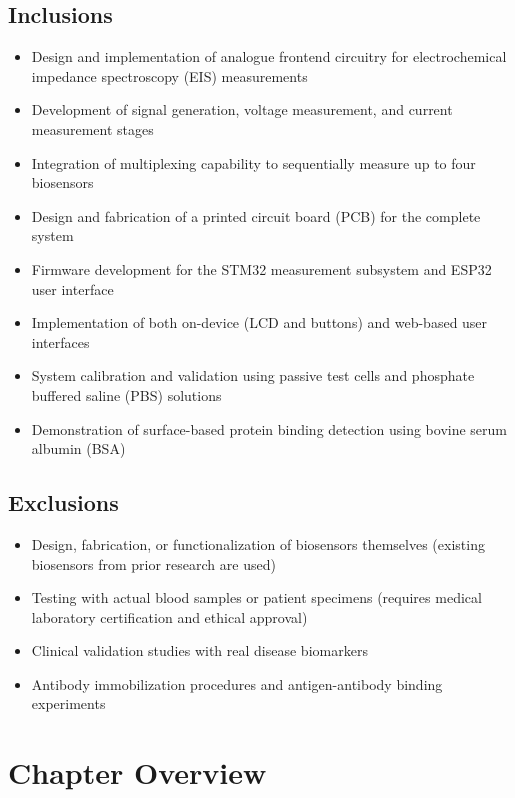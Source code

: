 \subsection{Inclusions}
\begin{itemize}
    \item Design and implementation of analogue frontend circuitry for electrochemical impedance spectroscopy (EIS) measurements
    \item Development of signal generation, voltage measurement, and current measurement stages
    \item Integration of multiplexing capability to sequentially measure up to four biosensors
    \item Design and fabrication of a printed circuit board (PCB) for the complete system
    \item Firmware development for the STM32 measurement subsystem and ESP32 user interface
    \item Implementation of both on-device (LCD and buttons) and web-based user interfaces
    \item System calibration and validation using passive test cells and phosphate buffered saline (PBS) solutions
    \item Demonstration of surface-based protein binding detection using bovine serum albumin (BSA)
\end{itemize}

\subsection{Exclusions}
\begin{itemize}
    \item Design, fabrication, or functionalization of biosensors themselves (existing biosensors from prior research are used)
    \item Testing with actual blood samples or patient specimens (requires medical laboratory certification and ethical approval)
    \item Clinical validation studies with real disease biomarkers
    \item Antibody immobilization procedures and antigen-antibody binding experiments
\end{itemize}

\section{Chapter Overview}

